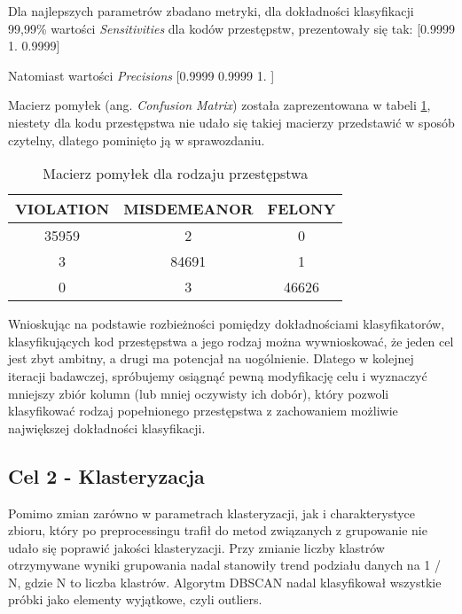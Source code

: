 \documentclass{classrep}
\begin{document}
{{            Dla najlepszych parametrów zbadano metryki, dla dokładności klasyfikacji 99,99\% wartości
            \textit{Sensitivities} dla kodów przestępstw, prezentowały się tak:
            [0.9999 1. 0.9999]

            Natomiast wartości \textit{Precisions} [0.9999 0.9999 1.    ]
        }

        Macierz pomyłek (ang. \textit{Confusion Matrix}) została zaprezentowana w tabeli
        \ref{tab:forest_forest_confusion_matrix_law_breaking_law}, niestety dla kodu przestępstwa nie udało
        się takiej macierzy przedstawić w sposób czytelny, dlatego pominięto ją w sprawozdaniu.
        \begin{table}[!htbp]
            \centering
            \begin{tabular}{|c|c|c|}
                \hline
                VIOLATION & MISDEMEANOR & FELONY\\ \hline
                35959 & 2 & 0 \\ \hline
                3 & 84691 & 1 \\ \hline
                0 & 3 & 46626 \\ \hline
            \end{tabular}
            \caption
            {Macierz pomyłek dla rodzaju przestępstwa}
            \label{tab:forest_forest_confusion_matrix_law_breaking_law}
        \end{table}
        \FloatBarrier
        Wnioskując na podstawie rozbieżności pomiędzy dokładnościami klasyfikatorów, klasyfikujących kod
        przestępstwa a jego rodzaj można wywnioskować, że jeden cel jest zbyt ambitny, a drugi ma potencjał
        na uogólnienie. Dlatego w kolejnej iteracji badawczej, spróbujemy osiągnąć pewną modyfikację celu i
        wyznaczyć mniejszy zbiór kolumn (lub mniej oczywisty ich dobór), który pozwoli klasyfikować rodzaj
        popełnionego przestępstwa z zachowaniem możliwie największej dokładności klasyfikacji.

        \subsection{Cel 2 - Klasteryzacja} {
            Pomimo zmian zarówno w parametrach klasteryzacji, jak i charakterystyce zbioru, który po
            preprocessingu trafił do metod związanych z grupowanie nie udało się poprawić jakości
            klasteryzacji. Przy zmianie liczby klastrów otrzymywane wyniki grupowania nadal stanowiły trend
            podziału danych na 1 / N, gdzie N to liczba klastrów. Algorytm DBSCAN nadal klasyfikował
            wszystkie próbki jako elementy wyjątkowe, czyli outliers.
        }

    }

    \begin{thebibliography}{0}
    \end{thebibliography}
\end{document}
